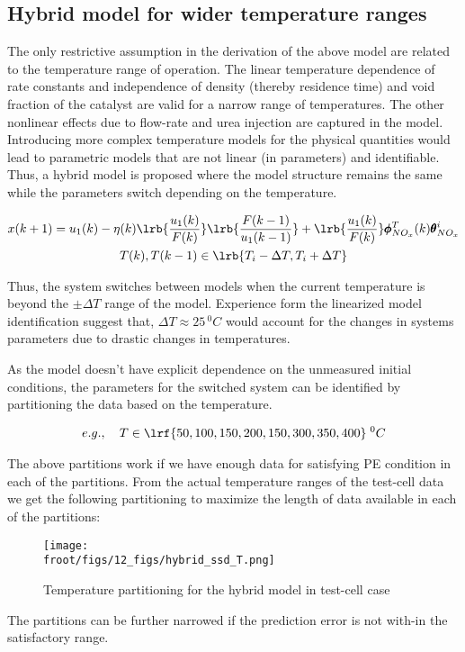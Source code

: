 \subsection{Hybrid model for wider temperature ranges}

The only restrictive assumption in the derivation of the above model are related to the temperature range of operation.
The linear temperature dependence of rate constants and independence of density (thereby residence time) and void
fraction of the catalyst are valid for a narrow range of temperatures. The other nonlinear effects due to flow-rate and
urea injection are captured in the model. Introducing more complex temperature models for the physical quantities would
lead to parametric models that are not linear (in parameters) and identifiable. Thus, a hybrid model is proposed where
the model structure remains the same while the parameters switch depending on the temperature.

\begin{multline}
        x(k+1) = u_1(k) - \eta(k) \lrb{\frac{u_1(k)}{F(k)}} \lrb{\frac{F(k-1)}{u_1(k-1)}}
                        + \lrb{\frac{u_1(k)}{F(k)}} \pmb \phi^{T}_{NO_x}(k) \pmb \theta^i_{NO_x}
        \\
        T(k), T(k-1) \in \lrb{T_i-\Delta T, T_i + \Delta T}
\end{multline}

Thus, the system switches between models when the current temperature is beyond the $\pm \Delta T$ range of the model.
Experience form the linearized model identification suggest that, $\Delta T \approx 25 \, ^0C$ would account for
the changes in systems parameters due to drastic changes in temperatures.

As the model doesn't have explicit dependence on the unmeasured initial conditions, the parameters for the switched system can be identified by partitioning the data based on the temperature.

\begin{align}
        e.g., \quad T \in \lrf{50, 100, 150, 200, 150, 300, 350, 400} \; ^0C
\end{align}

The above partitions work if we have enough data for satisfying PE condition in each of the partitions. From the actual temperature ranges of the test-cell data we get the following partitioning to maximize the length of data available in each of the partitions:


\begin{figure}[H]
        \centering
        \texttt{[image: \\froot/figs/12\_figs/hybrid\_ssd\_T.png]}
        \caption{Temperature partitioning for the hybrid model in test-cell case}
\end{figure}

The partitions can be further narrowed if the prediction error is not with-in the satisfactory range.
